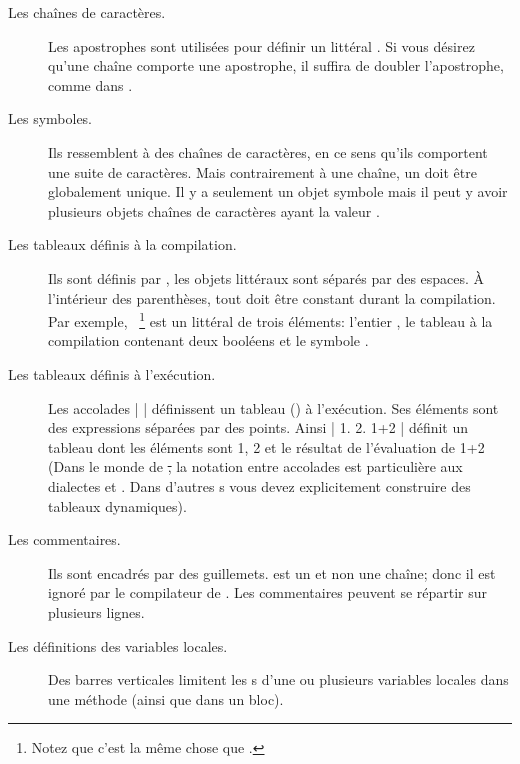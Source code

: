 \documentclass[a4paper,10pt,twoside]{book}
\begin{document}
\begin{description}
\item[Les chaînes de caractères.] Les apostrophes sont utilisées pour définir un  littéral .
Si vous désirez qu'une chaîne comporte une apostrophe, il suffira de doubler l'apostrophe, comme dans .

\item[Les symboles.] Ils ressemblent à des chaînes de caractères, en ce sens qu'ils comportent une suite de caractères.  
Mais contrairement à une chaîne, un  doit être globalement unique.
Il y a seulement un objet symbole  mais il peut y avoir plusieurs objets chaînes de caractères ayant la valeur .

\item[Les tableaux définis à la compilation.] Ils sont définis par \ct{#( )}, les objets littéraux 
sont séparés par des espaces.
À l'intérieur des parenthèses, tout doit être constant durant la compilation.
Par exemple, ~\footnote{Notez que c'est la même chose 
que .} est un  littéral de 
trois éléments: l'entier , le tableau à la compilation contenant deux 
booléens et le symbole .


\item[Les tableaux définis à l'exécution.] Les accolades \ct|{ }|
  définissent un tableau () à l'exécution.
Ses éléments sont des expressions séparées par des points.
Ainsi \ct|{ 1. 2. 1+2 }| définit un tableau dont les éléments sont 1, 2 et le résultat de l'évaluation de 1+2
(Dans le monde de \st, la notation entre accolades est particulière aux dialectes \pharo et \squeak.
Dans d'autres \st{}s vous devez explicitement construire des tableaux dynamiques).

\item[Les commentaires.] Ils sont encadrés par des guillemets.
 est un  et non une
chaîne; donc il est ignoré par le compilateur de \pharo.
Les commentaires peuvent se répartir sur plusieurs lignes.
		
\item[Les définitions des variables locales.] Des barres
  verticales \ct{| |} limitent les
  s d'une ou plusieurs variables
  locales dans une méthode (ainsi que dans un bloc).


\end{description}
\end{document}

